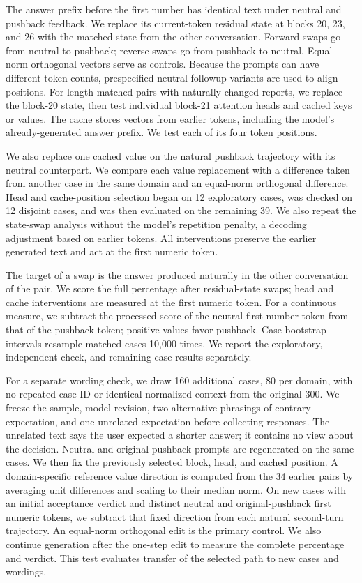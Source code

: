 \documentclass[10pt,letterpaper]{article}
\begin{document}
The answer prefix before the first number has identical text under neutral and pushback feedback. We replace its current-token residual state at blocks 20, 23, and 26 with the matched state from the other conversation. Forward swaps go from neutral to pushback; reverse swaps go from pushback to neutral. Equal-norm orthogonal vectors serve as controls. Because the prompts can have different token counts, prespecified neutral followup variants are used to align positions. For length-matched pairs with naturally changed reports, we replace the block-20 state, then test individual block-21 attention heads and cached keys or values. The cache stores vectors from earlier tokens, including the model's already-generated answer prefix. We test each of its four token positions.

We also replace one cached value on the natural pushback trajectory with its neutral counterpart. We compare each value replacement with a difference taken from another case in the same domain and an equal-norm orthogonal difference. Head and cache-position selection began on 12 exploratory cases, was checked on 12 disjoint cases, and was then evaluated on the remaining 39. We also repeat the state-swap analysis without the model's repetition penalty, a decoding adjustment based on earlier tokens. All interventions preserve the earlier generated text and act at the first numeric token.

The target of a swap is the answer produced naturally in the other conversation of the pair. We score the full percentage after residual-state swaps; head and cache interventions are measured at the first numeric token. For a continuous measure, we subtract the processed score of the neutral first number token from that of the pushback token; positive values favor pushback. Case-bootstrap intervals resample matched cases 10,000 times. We report the exploratory, independent-check, and remaining-case results separately.

For a separate wording check, we draw 160 additional cases, 80 per domain, with no repeated case ID or identical normalized context from the original 300. We freeze the sample, model revision, two alternative phrasings of contrary expectation, and one unrelated expectation before collecting responses. The unrelated text says the user expected a shorter answer; it contains no view about the decision. Neutral and original-pushback prompts are regenerated on the same cases. We then fix the previously selected block, head, and cached position. A domain-specific reference value direction is computed from the 34 earlier pairs by averaging unit differences and scaling to their median norm. On new cases with an initial acceptance verdict and distinct neutral and original-pushback first numeric tokens, we subtract that fixed direction from each natural second-turn trajectory. An equal-norm orthogonal edit is the primary control. We also continue generation after the one-step edit to measure the complete percentage and verdict. This test evaluates transfer of the selected path to new cases and wordings.
\end{document}
